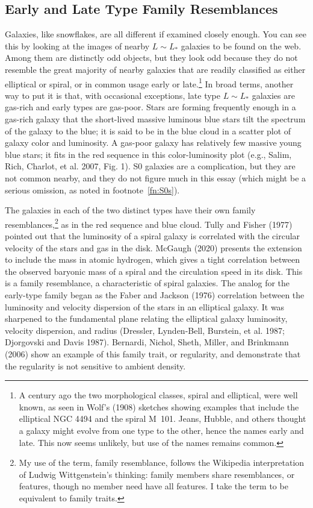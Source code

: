 \documentclass[fleqn,usenatbib]{mnras}
\begin{document}
\subsection{Early and Late Type Family Resemblances} \label{sec:earlyandlate}

Galaxies, like snowflakes, are all different if examined closely enough. You can see this by looking at the images of nearby $L\sim L_\ast$ galaxies to be found on the web. Among them are distinctly odd objects, but they look odd because they do not resemble the great majority of nearby galaxies that are readily classified as either elliptical or spiral, or in common usage early or late.\footnote{A century ago the two morphological classes, spiral and elliptical, were well known, as seen in Wolf's (1908) sketches showing examples that include the elliptical NGC 4494 and the spiral M~101. Jeans, Hubble, and others thought a galaxy might evolve from one type to the other, hence the names early and late. This now seems unlikely, but use of the names remains common.} In broad terms, another way to put it is that, with occasional exceptions, late type $L\sim L_\ast$ galaxies are gas-rich and early types are gas-poor. Stars are forming frequently enough in a gas-rich galaxy that the short-lived massive luminous blue stars tilt the spectrum of the galaxy to the blue; it is said to be in the blue cloud in a scatter plot of galaxy color and luminosity. A gas-poor galaxy has relatively few massive young blue stars; it fits in the red sequence in this color-luminosity plot (e.g., Salim, Rich, Charlot, et al. 2007, Fig. 1). S0 galaxies are a complication, but they are not common nearby, and they do not figure much in this essay (which might be a serious omission, as noted in footnote~\ref{fn:S0s}).

The galaxies in each of the two distinct types have their own family resemblances,\footnote{My use of the term, family resemblance, follows the Wikipedia interpretation of Ludwig Wittgenstein's thinking: family members share resemblances, or features, though no member need have all features. I take the term to be equivalent to family traits.} as in the red sequence and blue cloud. Tully and Fisher (1977) pointed out that the luminosity of a spiral galaxy is correlated with the circular velocity of the stars and gas in the disk. McGaugh (2020) presents the extension to include the mass in atomic hydrogen, which gives a tight correlation between the observed baryonic mass of a spiral and the circulation speed in its disk. This is a family resemblance, a characteristic of spiral galaxies. The analog for the early-type family began as the Faber and Jackson (1976) correlation between the luminosity and velocity dispersion of the stars in an elliptical galaxy. It was sharpened to the fundamental plane relating the elliptical galaxy luminosity, velocity dispersion, and radius (Dressler, Lynden-Bell, Burstein, et al. 1987; Djorgovski and Davis 1987). Bernardi, Nichol, Sheth, Miller, and Brinkmann (2006) show an example of this family trait, or regularity, and demonstrate that the regularity  is not sensitive to ambient density.
\end{document}
